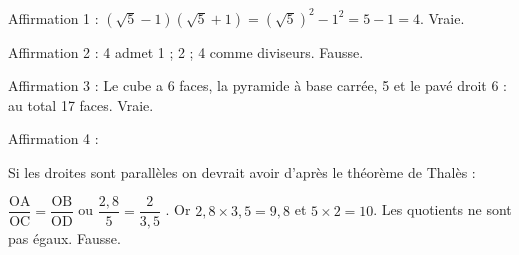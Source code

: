 
\medskip

 
Affirmation 1 : $\left(\sqrt{5} - 1 \right)\left(\sqrt{5} + 1\right) = \left(\sqrt{5} \right)^2 - 1^2 = 5 - 1 = 4$. Vraie.%

\medskip

Affirmation 2 : %
4 admet 1 ; 2 ; 4 comme diviseurs. Fausse.
\medskip
 
Affirmation 3 : %
Le cube a 6 faces, la pyramide à base carrée, 5 et le pavé droit 6 : au total 17 faces. Vraie.
\medskip
 
Affirmation 4 : 

%
Si les droites sont parallèles on devrait avoir d'après le théorème de Thalès :

$\dfrac{\text{OA}}{\text{OC}} = \dfrac{\text{OB}}{\text{OD}}$ ou $\dfrac{2,8}{5} = \dfrac{2}{3,5}$ . Or $2,8 \times 3,5 = 9,8$ et $5 \times 2 = 10$. Les quotients ne sont pas égaux. Fausse.

\bigskip

